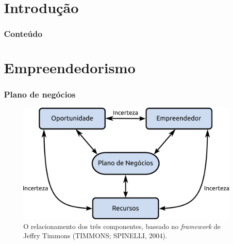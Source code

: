 \section*{Introdução}

\begin{frame}
	\frametitle{Conteúdo}
	\tableofcontents[pausesections]
\end{frame}

\section{Empreendedorismo}


\begin{frame}
    \frametitle{Plano de negócios}


\begin{figure}[!h]
	\begin{center}
		\includegraphics[scale=0.5]{imagens/componentes.pdf}
	\end{center}
	\caption{O relacionamento dos três componentes, baseado no 
		\textit{framework} de Jeffry Timmons (TIMMONS; SPINELLI, 2004).}			
\end{figure}

\end{frame}


